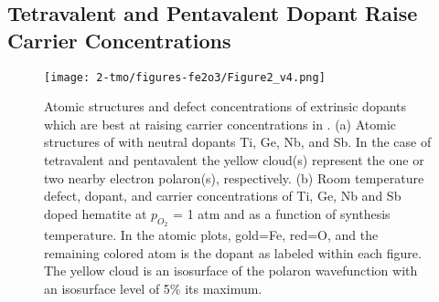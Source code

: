 \subsection{Tetravalent and Pentavalent Dopant Raise Carrier Concentrations}

 \begin{figure}[H]
\centering
\texttt{[image: 2-tmo/figures-fe2o3/Figure2\_v4.png]}
\caption{
Atomic structures and defect concentrations of extrinsic dopants which are best at raising carrier concentrations in .
(a) Atomic structures of  with neutral dopants Ti, Ge, Nb, and Sb. In the case of tetravalent and pentavalent the yellow cloud(s) represent the one or two nearby electron polaron(s), respectively.
(b) Room temperature defect, dopant, and carrier concentrations of Ti, Ge, Nb and Sb doped hematite at $p_{O_2}$ = 1 atm and as a function of synthesis temperature.
In the atomic plots, gold=Fe, red=O, and the remaining colored atom is the dopant as labeled within each figure.
The yellow cloud is an isosurface of the polaron wavefunction with an isosurface level of 5\% its maximum.
}
\label{fig:dopant}
 \end{figure}


